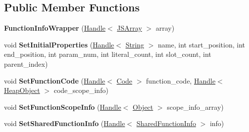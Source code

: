 \subsection*{Public Member Functions}
\begin{DoxyCompactItemize}
\item 
\hypertarget{classv8_1_1internal_1_1_function_info_wrapper_af1e72c029e4cd74114996cb24a108dc1}{}{\bfseries Function\+Info\+Wrapper} (\hyperlink{classv8_1_1internal_1_1_handle}{Handle}$<$ \hyperlink{classv8_1_1internal_1_1_j_s_array}{J\+S\+Array} $>$ array)\label{classv8_1_1internal_1_1_function_info_wrapper_af1e72c029e4cd74114996cb24a108dc1}

\item 
\hypertarget{classv8_1_1internal_1_1_function_info_wrapper_a6b2d9c5cf36689263ccad595f93ef503}{}void {\bfseries Set\+Initial\+Properties} (\hyperlink{classv8_1_1internal_1_1_handle}{Handle}$<$ \hyperlink{classv8_1_1internal_1_1_string}{String} $>$ name, int start\+\_\+position, int end\+\_\+position, int param\+\_\+num, int literal\+\_\+count, int slot\+\_\+count, int parent\+\_\+index)\label{classv8_1_1internal_1_1_function_info_wrapper_a6b2d9c5cf36689263ccad595f93ef503}

\item 
\hypertarget{classv8_1_1internal_1_1_function_info_wrapper_ad29316e6dc3bbb1bc1f1a20f21f62660}{}void {\bfseries Set\+Function\+Code} (\hyperlink{classv8_1_1internal_1_1_handle}{Handle}$<$ \hyperlink{classv8_1_1internal_1_1_code}{Code} $>$ function\+\_\+code, \hyperlink{classv8_1_1internal_1_1_handle}{Handle}$<$ \hyperlink{classv8_1_1internal_1_1_heap_object}{Heap\+Object} $>$ code\+\_\+scope\+\_\+info)\label{classv8_1_1internal_1_1_function_info_wrapper_ad29316e6dc3bbb1bc1f1a20f21f62660}

\item 
\hypertarget{classv8_1_1internal_1_1_function_info_wrapper_aadacecb4061d530343a76d8043034605}{}void {\bfseries Set\+Function\+Scope\+Info} (\hyperlink{classv8_1_1internal_1_1_handle}{Handle}$<$ \hyperlink{classv8_1_1internal_1_1_object}{Object} $>$ scope\+\_\+info\+\_\+array)\label{classv8_1_1internal_1_1_function_info_wrapper_aadacecb4061d530343a76d8043034605}

\item 
\hypertarget{classv8_1_1internal_1_1_function_info_wrapper_a6fec8707c10f873bb9273f907639254f}{}void {\bfseries Set\+Shared\+Function\+Info} (\hyperlink{classv8_1_1internal_1_1_handle}{Handle}$<$ \hyperlink{classv8_1_1internal_1_1_shared_function_info}{Shared\+Function\+Info} $>$ info)\label{classv8_1_1internal_1_1_function_info_wrapper_a6fec8707c10f873bb9273f907639254f}


\end{DoxyCompactItemize}
